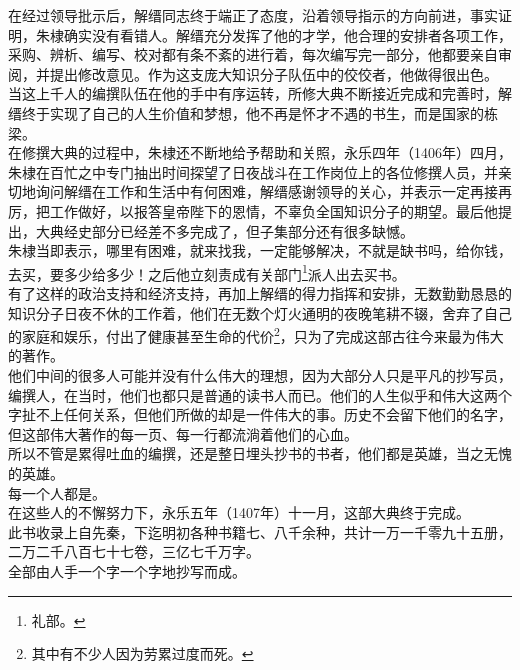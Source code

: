 \begin{multicols}{\theparacolNo}
在经过领导批示后，解缙同志终于端正了态度，沿着领导指示的方向前进，事实证明，朱棣确实没有看错人。解缙充分发挥了他的才学，他合理的安排者各项工作，采购、辨析、编写、校对都有条不紊的进行着，每次编写完一部分，他都要亲自审阅，并提出修改意见。作为这支庞大知识分子队伍中的佼佼者，他做得很出色。\\

当这上千人的编撰队伍在他的手中有序运转，所修大典不断接近完成和完善时，解缙终于实现了自己的人生价值和梦想，他不再是怀才不遇的书生，而是国家的栋梁。\\

在修撰大典的过程中，朱棣还不断地给予帮助和关照，永乐四年（1406年）四月，朱棣在百忙之中专门抽出时间探望了日夜战斗在工作岗位上的各位修撰人员，并亲切地询问解缙在工作和生活中有何困难，解缙感谢领导的关心，并表示一定再接再厉，把工作做好，以报答皇帝陛下的恩情，不辜负全国知识分子的期望。最后他提出，大典经史部分已经差不多完成了，但子集部分还有很多缺憾。\\

朱棣当即表示，哪里有困难，就来找我，一定能够解决，不就是缺书吗，给你钱，去买，要多少给多少！之后他立刻责成有关部门\footnote{礼部。}派人出去买书。\\

有了这样的政治支持和经济支持，再加上解缙的得力指挥和安排，无数勤勤恳恳的知识分子日夜不休的工作着，他们在无数个灯火通明的夜晚笔耕不辍，舍弃了自己的家庭和娱乐，付出了健康甚至生命的代价\footnote{其中有不少人因为劳累过度而死。}，只为了完成这部古往今来最为伟大的著作。\\

他们中间的很多人可能并没有什么伟大的理想，因为大部分人只是平凡的抄写员，编撰人，在当时，他们也都只是普通的读书人而已。他们的人生似乎和伟大这两个字扯不上任何关系，但他们所做的却是一件伟大的事。历史不会留下他们的名字，但这部伟大著作的每一页、每一行都流淌着他们的心血。\\

所以不管是累得吐血的编撰，还是整日埋头抄书的书者，他们都是英雄，当之无愧的英雄。\\

每一个人都是。\\

在这些人的不懈努力下，永乐五年（1407年）十一月，这部大典终于完成。\\

此书收录上自先秦，下迄明初各种书籍七、八千余种，共计一万一千零九十五册，二万二千八百七十七卷，三亿七千万字。\\

全部由人手一个字一个字地抄写而成。\\


\end{multicols}
